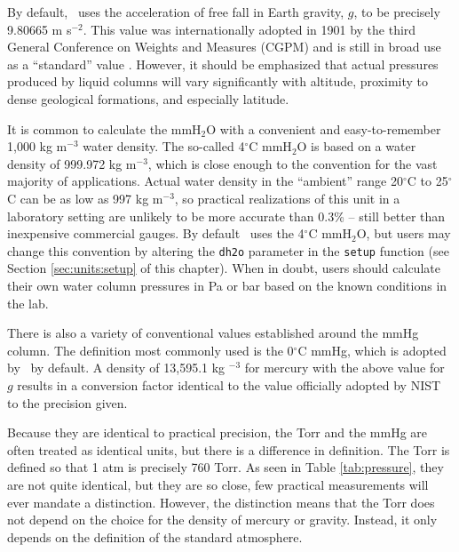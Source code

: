 By default, \PM\ uses the acceleration of free fall in Earth gravity, $g$, to be precisely 9.80665 m s$^{-2}$.  This value was internationally adopted in 1901 by the third General Conference on Weights and Measures (CGPM)\cite{cgpm:3:2} and is still in broad use as a ``standard'' value \cite[p.45]{nist:sp1038} \cite[p.5]{nist:sp811}.  However, it should be emphasized that actual pressures produced by liquid columns will vary significantly with altitude, proximity to dense geological formations, and especially latitude.  

It is common to calculate the mmH$_2$O with a convenient and easy-to-remember 1,000 kg m$^{-3}$ water density.  The so-called 4$^\circ$C mmH$_2$O is based on a water density of 999.972 kg m$^{-3}$, which is close enough to the convention for the vast majority of applications.  Actual water density in the ``ambient'' range 20$^\circ$C to 25$^\circ$C can be as low as 997 kg m$^{-3}$, so practical realizations of this unit in a laboratory setting are unlikely to be more accurate than 0.3\% -- still better than inexpensive commercial gauges.  By default \PM\ uses the 4$^\circ$C mmH$_2$O, but users may change this convention by altering the \verb|dh2o| parameter in the \verb|setup| function (see Section \ref{sec:units:setup} of this chapter).  When in doubt, users should calculate their own water column pressures in Pa or bar based on the known conditions in the lab.

There is also a variety of conventional values established around the mmHg column.  The definition most commonly used is the 0$^\circ$C mmHg, which is adopted by \PM\ by default.  A density of 13,595.1 kg $^{-3}$ for mercury with the above value for $g$ results in a conversion factor identical to the value officially adopted by NIST \cite[p.52]{nist:sp811} to the precision given.

Because they are identical to practical precision, the Torr and the mmHg are often treated as identical units, but there is a difference in definition.  The Torr is defined so that 1 atm is precisely 760 Torr.  As seen in Table \ref{tab:pressure}, they are not quite identical, but they are so close, few practical measurements will ever mandate a distinction.  However, the distinction means that the Torr does not depend on the choice for the density of mercury or gravity.  Instead, it only depends on the definition of the standard atmosphere.

